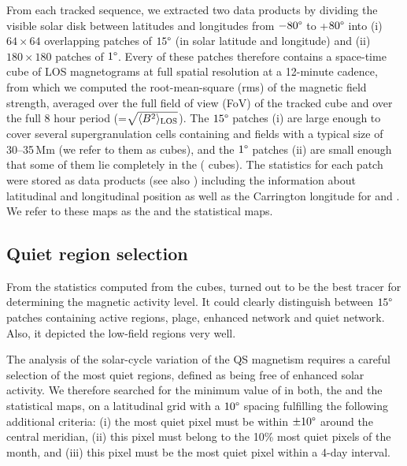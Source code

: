 \documentclass{aa}
\begin{document}
From each tracked sequence, we extracted two data products by dividing the visible solar disk  between latitudes and longitudes from $-80\degree$ to +$80\degree$ into (i) $64\times 64$  overlapping patches of $15\degree$ (in solar latitude and longitude)  and (ii) $180\times 180$ patches of $1\degree$.
Every of these patches therefore contains a space-time cube of LOS magnetograms at full spatial resolution at a 12-minute cadence,
from which we 
computed the 
root-mean-square
(rms) 
of the magnetic field strength, averaged over the full field of view (FoV) of the tracked cube 
and over the full 8 hour period
(\brms{}=$\sqrt{\langle B^2\rangle_{\rm LOS}}$).
The $15\degree$ patches (i) are large enough to cover several supergranulation cells containing \NW{} and \IN{} fields \cite[]{2010LRSP....7....2R} with a typical size of 30--35\,Mm (we refer to them as \nw{} cubes), and the $1\degree$ patches (ii) are small enough that some of them lie completely in the \IN{} (\inw{} cubes). 
The statistics for each patch were stored as data products (see also ) including the information about 
latitudinal and longitudinal position as well as the Carrington 
longitude for \NW{} and \IN{}. We refer to these maps as the \nw{} and the \inw{} statistical maps.

\subsection{Quiet region selection\label{quietregion}}

From the 
statistics computed from the cubes, 
\brms{}
turned out to be the best tracer for determining the magnetic activity level. It could clearly distinguish between $15\degree$ patches containing active regions, plage, enhanced network and quiet network. Also, it depicted
the low-field \IN{} regions very well.

The analysis of the solar-cycle variation of the 
QS
magnetism requires a careful selection of the most quiet regions, defined as being free of enhanced solar activity. We therefore searched for the minimum value of \brms{} in both, the \nw{} and the \inw{} statistical maps, on a latitudinal grid with a $10\degree$ spacing fulfilling the following additional criteria:
(i) the most quiet pixel must be within $\pm10\degree$ around the central meridian,
(ii) this pixel must belong to the 10\% most quiet pixels of the month, and
(iii) this pixel must be the most quiet pixel within a 4-day interval.
\end{document}
